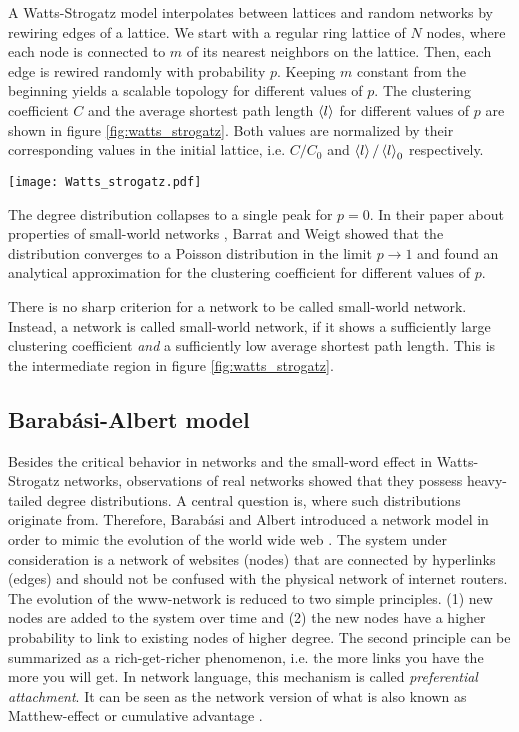 \documentclass[openright,twoside,headsepline]{scrbook}
\begin{document}
A Watts-Strogatz model interpolates between lattices and random networks by rewiring edges of a lattice.
We start with a regular ring lattice of $N$ nodes, where each node is connected to $m$ of its nearest neighbors on the lattice.
Then, each edge is rewired randomly with probability $p$.
Keeping $m$ constant from the beginning yields a scalable topology for different values of $p$.
The clustering coefficient $C$ and the average shortest path length $\left< l \right>$ for different values of $p$ are shown in figure \ref{fig:watts_strogatz}.
Both values are normalized by their corresponding values in the initial lattice, i.e. $C/C_0$ and $\left< l \right>/\left< l \right>_0$ respectively.
%
\begin{SCfigure}
\texttt{[image: Watts\_strogatz.pdf]}
\caption{Clustering coefficient and average shortest path length in the Watts-Strogatz model.
Both quantities are  normalized to the the corresponding value for $p=0$.
Results for networks with $N=1000$ nodes and $m=10$.
Every data point is the average of 1000 realizations.}
\label{fig:watts_strogatz}
\end{SCfigure}

The degree distribution collapses to a single peak for $p=0$.
In their paper about properties of small-world networks \citep{Barrat:2000fj}, Barrat and Weigt showed that the distribution converges to a Poisson distribution in the limit $p\rightarrow 1$ and found an analytical approximation for the clustering coefficient for different values of $p$.

There is no sharp criterion for a network to be called small-world network.
Instead, a network is called small-world network, if it shows a sufficiently large clustering coefficient \emph{and} a sufficiently low average shortest path length.
This is the intermediate region in figure \ref{fig:watts_strogatz}. 

\subsection{Barab\'asi-Albert model}
Besides the critical behavior in \ER networks and the small-word effect in Watts-Strogatz networks, observations of real networks showed that they possess heavy-tailed degree distributions.
A central question is, where such distributions originate from.
Therefore, Barab\'asi and Albert introduced a network model in order to mimic the evolution of the world wide web \citep{Barabasi99}.
The system under consideration is a network of websites (nodes) that are connected by hyperlinks (edges) and should not be confused with the physical network of internet routers.
The evolution of the www-network is reduced to two simple principles.
(1) new nodes are added to the system over time and (2) the new nodes have a higher probability to link to existing nodes of higher degree.
The second principle can be summarized as a rich-get-richer phenomenon, i.e. the more links you have the more you will get.
In network language, this mechanism is called \emph{preferential attachment}.
It can be seen as the network version of what is also known as Matthew-effect or cumulative advantage \citep{Merton:1968fh,price:1976}.
\end{document}

